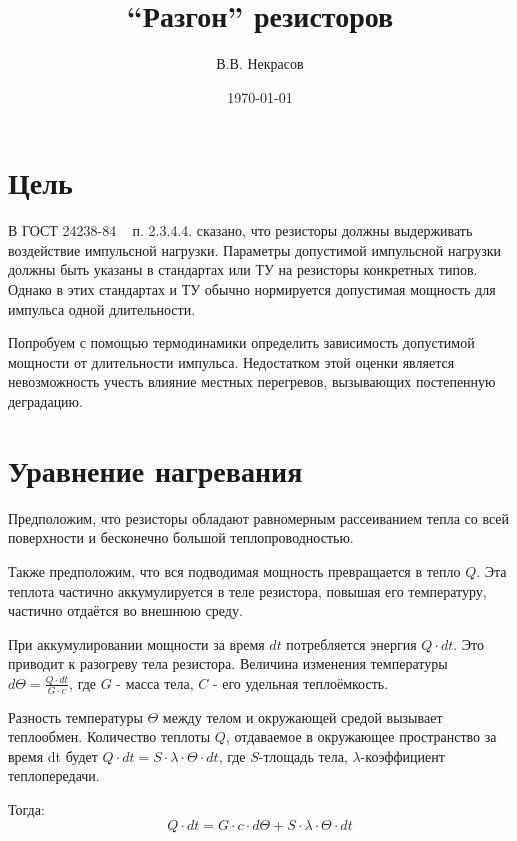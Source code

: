 \documentclass[a4paper]{article}
\begin{document}
\title{``Разгон'' резисторов}
\author{В.В. Некрасов}
\date{\today}
\maketitle

\section{Цель}

    В ГОСТ 24238-84 ~\cite{gost24238-84} п. 2.3.4.4. сказано, что резисторы должны выдерживать воздействие импульсной нагрузки. Параметры
допустимой импульсной нагрузки должны быть указаны в стандартах или ТУ на резисторы конкретных типов. Однако
в этих стандартах и ТУ обычно нормируется допустимая мощность для импульса одной длительности.

	Попробуем с помощью термодинамики определить зависимость допустимой мощности от длительности импульса.
Недостатком этой оценки является невозможность учесть влияние местных перегревов, вызывающих постепенную
деградацию.

\section{Уравнение нагревания}

    Предположим, что резисторы обладают равномерным рассеиванием тепла со всей поверхности и бесконечно
большой теплопроводностью.

    Также предположим, что вся подводимая мощность превращается в тепло $Q$. Эта теплота частично
аккумулируется в теле резистора, повышая его температуру, частично отдаётся во внешнюю среду.

    При аккумулировании мощности за время $dt$ потребляется энергия $Q{\cdot}dt$. Это приводит к разогреву
тела резистора. Величина изменения температуры $d{{\Theta}}=\frac{Q{\cdot}dt}{G{\cdot}c}$, где $G$ - масса
тела, $C$ - его удельная теплоёмкость.

    Разность температуры ${\Theta}$ между телом и окружающей средой вызывает теплообмен. Количество
теплоты $Q$, отдаваемое в окружающее пространство за время dt будет
$Q{\cdot}dt=S{\cdot}{\lambda}{\cdot}{\Theta}{\cdot}dt$, где $S$-тлощадь тела, ${\lambda}$-коэффициент
теплопередачи.

    Тогда:
\begin{equation}
\label{e_balance}
Q{\cdot}dt=G{\cdot}c{\cdot}d{\Theta}+S{\cdot}{\lambda}{\cdot}{\Theta}{\cdot}dt
\end{equation}
\end{document}
